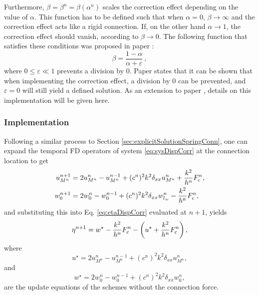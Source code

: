 Furthermore, $\beta = \beta^n = \beta(\alpha^n)$ scales the correction effect depending on the value of $\alpha$. This function has to be defined such that when $\alpha = 0$, $\beta\rightarrow \infty$ and the correction effect acts like a rigid connection. If, on the other hand $\alpha \rightarrow 1$, the correction effect should vanish, according to $\beta \rightarrow 0$. The following function that satisfies these conditions was proposed in paper \citeP[G]:
\begin{equation}\label{eq:betaDef}
    \beta  = \frac{1-\alpha}{\alpha + \varepsilon}\ ,
\end{equation}
where $0\leq\varepsilon \ll 1$ prevents a division by 0. Paper \citeP[G] states that it can be shown that when implementing the correction effect, a division by 0 can be prevented, and $\varepsilon = 0$ will still yield a defined solution. As an extension to paper \citeP[G], details on this implementation will be given here.

\subsubsection{Implementation}
Following a similar process to Section \ref{sec:explicitSolutionSpringConn}, one can expand the temporal FD operators of system \eqref{eq:sysDispCorr} at the connection location to get
\begin{subequations}\label{eq:sysDispCorrNp1}
    \begin{align}
        u_{M^n}^{n+1} &= 2u_{M^n}^{n} - u_{M^n}^{n-1} + (c^n)^2k^2\delta_{xx}u_{M^n}^{n}+ \frac{k^2}{h^n}
        F_\text{c}^n,\\
        w_{0}^{n+1} &= 2w_{0}^{n} - w_0^{n-1} + (c^n)^2k^2\delta_{xx}w_{l_w}^n - \frac{k^2}{h^n}
        F_\text{c}^n,
    \end{align}
\end{subequations}
and substituting this into Eq. \eqref{eq:etaDispCorr} evaluated at $n+1$, yields
\begin{equation}\label{eq:etaNextDispCorr1}
    \eta^{n+1} = w^\star-\frac{k^2}{h^n}F_{\text{c}}^n-\left(u^\star+\frac{k^2}{h^n}F_{\text{c}}^n\right),
\end{equation}
where 
\begin{equation*}
    u^\star = 2u_{M^n}^{n} - u_{M^n}^{n-1} + (c^n)^2k^2\delta_{xx}u_{M^n}^{n},
\end{equation*} 
and 
\begin{equation*}
    w^\star = 2w_{0}^{n} - w_0^{n-1} + (c^n)^2k^2\delta_{xx}w_0^n ,
\end{equation*}
are the update equations of the schemes without the connection force. 

